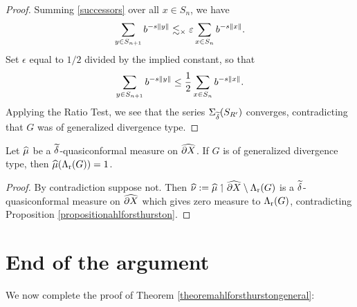 \begin{proof}
Summing \eqref{successors} over all $x\in S_n$, we have
\[
\sum_{y\in S_{n + 1}}b^{-s\|y\|} \lesssim_\times \varepsilon
\sum_{x\in S_n}b^{-s\|x\|}. 
\]
Set $\epsilon$ equal to $1/2$ divided by the implied constant, so that
\[
\sum_{y\in S_{n + 1}}b^{-s\|y\|} \leq \frac12 \sum_{x\in S_n}b^{-s\|x\|}.
\]
Applying the Ratio Test, we see that the series $\Sigma_{\widetilde\delta}(S_{R'})$ converges, contradicting that $G$ was of generalized divergence type. 
\end{proof}

\begin{corollary}
\label{corollaryahlforsthurston}
Let $\widehat\mu$ be a $\widetilde\delta$-quasiconformal measure on $\widehat{\partial X}$. If $G$ is of generalized divergence type, then $\widehat\mu(\Lambda_{\mathrm r}(G)) = 1$.
\end{corollary}
\begin{proof}
By contradiction suppose not. Then $\widehat\nu := \widehat\mu\upharpoonleft \widehat{\partial X}\setminus\Lambda_{\mathrm r}(G)$ is a $\widetilde\delta$-quasiconformal measure on $\widehat{\partial X}$ which gives zero measure to $\Lambda_{\mathrm r}(G)$, contradicting Proposition \ref{propositionahlforsthurston}.
\end{proof}

\section{End of the argument}
We now complete the proof of Theorem \ref{theoremahlforsthurstongeneral}:

